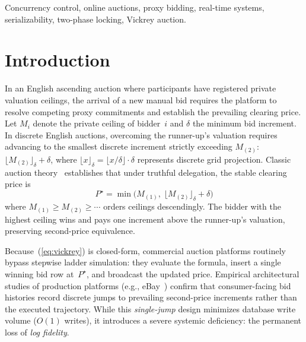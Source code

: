 \documentclass[conference]{IEEEtran}
\begin{document}
\begin{IEEEkeywords}
Concurrency control, online auctions, proxy bidding, real-time systems,
serializability, two-phase locking, Vickrey auction.
\end{IEEEkeywords}

\section{Introduction}

In an English ascending auction where participants have registered private valuation
ceilings, the arrival of a new manual bid requires the platform to resolve competing
proxy commitments and establish the prevailing clearing price. Let $M_i$ denote the
private ceiling of bidder~$i$ and $\delta$ the minimum bid increment. In discrete
English auctions, overcoming the runner-up's valuation requires advancing to the
smallest discrete increment strictly exceeding $M_{(2)}$:
$\lfloor M_{(2)} \rfloor_\delta + \delta$, where $\lfloor x \rfloor_\delta = \lfloor x / \delta \rfloor \cdot \delta$
represents discrete grid projection. Classic auction theory~\cite{Vickrey1961}
establishes that under truthful delegation, the stable clearing price is
\begin{equation}
  P^\star = \min\!\bigl(M_{(1)},\; \lfloor M_{(2)} \rfloor_\delta + \delta\bigr)
  \label{eq:vickrey}
\end{equation}
where $M_{(1)} \geq M_{(2)} \geq \cdots$ orders ceilings descendingly. The bidder
with the highest ceiling wins and pays one increment above the runner-up's valuation,
preserving second-price equivalence.

Because~(\ref{eq:vickrey}) is closed-form, commercial auction platforms routinely
bypass stepwise ladder simulation: they evaluate the formula, insert a single winning
bid row at~$P^\star$, and broadcast the updated price. Empirical architectural studies
of production platforms (e.g., eBay~\cite{Roth2002,Shoup2004,Ockenfels2006}) confirm that
consumer-facing bid histories record discrete jumps to prevailing second-price increments
rather than the executed trajectory. While this \emph{single-jump} design minimizes
database write volume ($O(1)$ writes), it introduces a severe systemic deficiency:
the permanent loss of \emph{log fidelity}.
\end{document}
